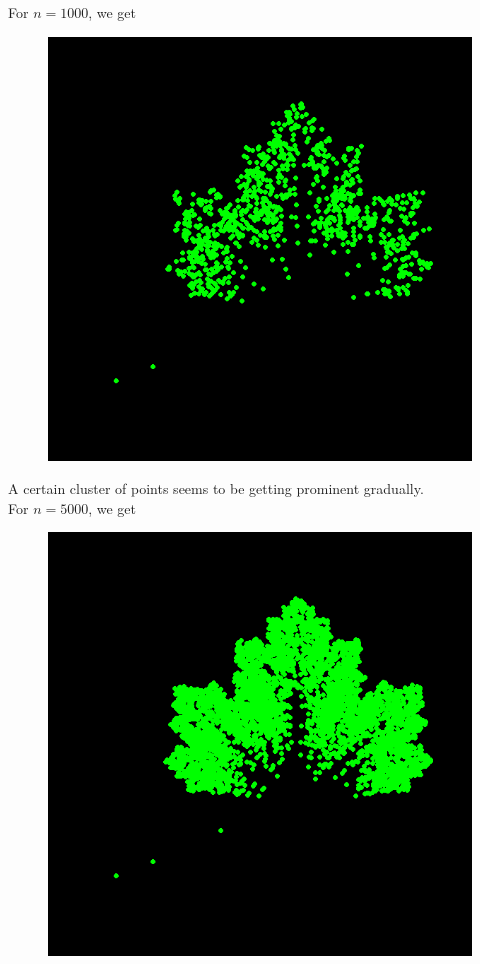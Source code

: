 \documentclass[11pt, a4paper]{article}
\begin{document}
For $n = 1000$, we get

\begin{figure}[h]
\centering
\includegraphics[scale=0.3]{04}
\end{figure}

A certain cluster of points seems to be getting prominent gradually. \\

For $n = 5000$, we get

\begin{figure}[!htbp]
\centering
\includegraphics[scale=0.3]{05}
\end{figure}
\end{document}
